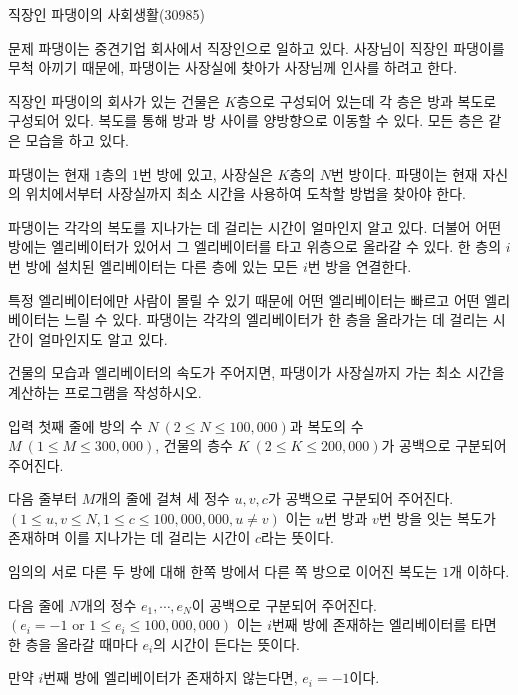 
\begin{frame}[label=p2]{직장인 파댕이의 사회생활(30985)}

\tiny

\begin{block}{문제}
파댕이는 중견기업 회사에서 직장인으로 일하고 있다. 사장님이 직장인 파댕이를 무척 아끼기 때문에, 파댕이는 사장실에 찾아가 사장님께 인사를 하려고 한다.

직장인 파댕이의 회사가 있는 건물은 $K$층으로 구성되어 있는데 각 층은 방과 복도로 구성되어 있다. 복도를 통해 방과 방 사이를 양방향으로 이동할 수 있다. 모든 층은 같은 모습을 하고 있다.

파댕이는 현재 $1$층의 $1$번 방에 있고, 사장실은 $K$층의 $N$번 방이다. 파댕이는 현재 자신의 위치에서부터 사장실까지 최소 시간을 사용하여 도착할 방법을 찾아야 한다.

파댕이는 각각의 복도를 지나가는 데 걸리는 시간이 얼마인지 알고 있다. 더불어 어떤 방에는 엘리베이터가 있어서 그 엘리베이터를 타고 위층으로 올라갈 수 있다. 한 층의 $i$번 방에 설치된 엘리베이터는 다른 층에 있는 모든 $i$번 방을 연결한다.

특정 엘리베이터에만 사람이 몰릴 수 있기 때문에 어떤 엘리베이터는 빠르고 어떤 엘리베이터는 느릴 수 있다. 파댕이는 각각의 엘리베이터가 한 층을 올라가는 데 걸리는 시간이 얼마인지도 알고 있다.

건물의 모습과 엘리베이터의 속도가 주어지면, 파댕이가 사장실까지 가는 최소 시간을 계산하는 프로그램을 작성하시오.
\end{block}

\begin{block}{입력}
첫째 줄에 방의 수 $N\ (2 \leq N \leq 100{,}000)$과 복도의 수 $M\ (1 \leq M \leq 300{,}000)$, 건물의 층수 $K\ (2 \leq K \leq 200{,}000)$가 공백으로 구분되어 주어진다.

다음 줄부터 $M$개의 줄에 걸쳐 세 정수 $u, v, c$가 공백으로 구분되어 주어진다. $(1 \leq u, v \leq N, 1 \leq c \leq 100{,}000{,}000, u \neq v)$ 이는 $u$번 방과 $v$번 방을 잇는 복도가 존재하며 이를 지나가는 데 걸리는 시간이 $c$라는 뜻이다.

임의의 서로 다른 두 방에 대해 한쪽 방에서 다른 쪽 방으로 이어진 복도는 $1$개 이하다.

다음 줄에 $N$개의 정수 $e_1, \cdots, e_N$이 공백으로 구분되어 주어진다. $(e_i = -1 \text{ or } 1 \leq e_i \leq 100{,}000{,}000)$ 이는 $i$번째 방에 존재하는 엘리베이터를 타면 한 층을 올라갈 때마다 $e_i$의 시간이 든다는 뜻이다.

만약 $i$번째 방에 엘리베이터가 존재하지 않는다면, $e_i = -1$이다.
\end{block}

\end{frame}

